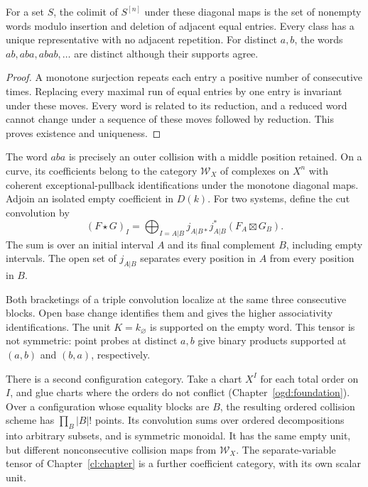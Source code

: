 \begin{proposition}\label{e1f:prop:words}
For a set \(S\), the colimit of \(S^{[n]}\) under these
diagonal maps is the set of nonempty words modulo insertion
and deletion of adjacent equal entries. Every class has a
unique representative with no adjacent repetition.
For distinct \(a,b\), the words \(ab,aba,abab,\ldots\)
are distinct although their supports agree.
\end{proposition}

\begin{proof}
A monotone surjection repeats each entry a positive number
of consecutive times. Replacing every maximal run of equal
entries by one entry is invariant under these moves.
Every word is related to its reduction, and a reduced word
cannot change under a sequence of these moves followed by
reduction. This proves existence and uniqueness.
\end{proof}

The word \(aba\) is precisely an outer collision with a
middle position retained. On a curve, its coefficients belong
to the category \(\mathcal W_X\) of complexes on \(X^n\)
with coherent exceptional-pullback identifications under the
monotone diagonal maps. Adjoin an isolated empty coefficient
in \(D(k)\). For two systems, define the cut convolution by
\begin{equation}\label{e1f:eq:cut}
 (F\star G)_I
   =\bigoplus_{I=A|B}j_{A|B*}j_{A|B}^*(F_A\boxtimes G_B).
\end{equation}
The sum is over an initial interval \(A\) and its final
complement \(B\), including empty intervals. The open set
of \(j_{A|B}\) separates every position in \(A\) from every
position in \(B\).

Both bracketings of a triple convolution localize at the
same three consecutive blocks. Open base change identifies
them and gives the higher associativity identifications.
The unit \(K=k_\varnothing\) is supported on the empty word.
This tensor is not symmetric: point probes at distinct
\(a,b\) give binary products supported at \((a,b)\) and
\((b,a)\), respectively.

There is a second configuration category. Take a chart
\(X^I\) for each total order on \(I\), and glue charts
where the orders do not conflict
(Chapter~\ref{ogd:foundation}). Over a configuration whose
equality blocks are \(B\), the resulting ordered collision
scheme has \(\prod_B|B|!\) points. Its convolution sums over
ordered decompositions into arbitrary subsets, and is
symmetric monoidal. It has the same empty unit, but different
nonconsecutive collision maps from \(\mathcal W_X\).
The separate-variable tensor of Chapter~\ref{cl:chapter}
is a further coefficient category, with its own scalar unit.

